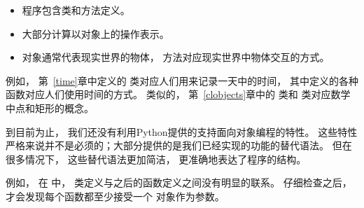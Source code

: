 \begin{itemize}

\item 程序包含类和方法定义。

\item 大部分计算以对象上的操作表示。

\item 对象通常代表现实世界的物体， 方法对应现实世界中物体交互的方式。

\end{itemize}


例如， 第~\ref{time}章中定义的  类对应人们用来记录一天中的时间， 其中定义的各种函数对应人们使用时间的方式。
类似的， 第~\ref{clobjects}章中的  类和  类对应数学中点和矩形的概念。


到目前为止， 我们还没有利用Python提供的支持面向对象编程的特性。
这些特性严格来说并不是必须的；大部分提供的是我们已经实现的功能的替代语法。
但在很多情况下， 这些替代语法更加简洁， 更准确地表达了程序的结构。


例如， 在  中， 类定义与之后的函数定义之间没有明显的联系。
仔细检查之后， 才会发现每个函数都至少接受一个  对象作为参数。


